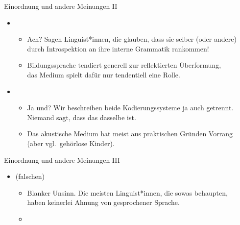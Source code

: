 \begin{frame}
  {Einordnung und andere Meinungen II}
  \pause
  \begin{itemize}[<+->]
    \item {}
      \begin{itemize}[<+->]
        \item \alert{Ach? Sagen Linguist*innen, die glauben, dass sie selber (oder andere)\\
          durch Introspektion an ihre interne Grammatik rankommen!}
        \item Bildungssprache tendiert generell zur reflektierten \alert{Überformung},\\
          das Medium spielt dafür nur tendentiell eine Rolle.
      \end{itemize}
      \Viertelzeile
    \item {}
      \begin{itemize}[<+->]
        \item \alert{Ja und? Wir beschreiben beide Kodierungssysteme ja auch getrennt.\\
          Niemand sagt, dass das dasselbe ist.}
        \item Das akustische Medium hat meist aus praktischen Gründen Vorrang\\
          (aber vgl.\ \zB gehörlose Kinder).
      \end{itemize}
  \end{itemize}
\end{frame}

\begin{frame}
  {Einordnung und andere Meinungen III}
  \pause
  \begin{itemize}[<+->]
    \item {} (falschen) 
      \begin{itemize}[<+->]
        \item \alert{Blanker Unsinn. Die meisten Linguist*innen, die sowas behaupten,\\
          haben keinerlei Ahnung von gesprochener Sprache.}
        \item {}
      \end{itemize}
  \end{itemize}
\end{frame}


